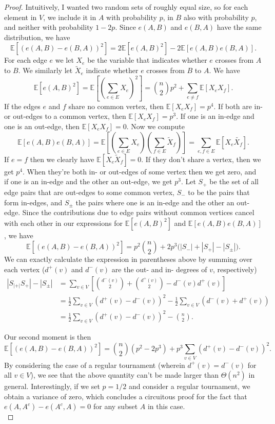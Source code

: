\documentclass[11pt,letterpaper]{report}
\newcommand{\E}{\mathbb{E}}
\begin{document}
\begin{proof}
    Intuitively, I wanted two random sets of roughly equal size, so for each element in $V$, we include it in $A$ with probability $p$, in $B$ also with probability $p$, and neither with probability $1-2p$.
    Since $e(A,B)$ and $e(B,A)$ have the same distribution, we have
    \[
        \E[(e(A,B) - e(B,A))^2] = 2\E[e(A,B)^2] - 2\E[e(A,B)e(B,A)].
    \]
    For each edge $e$ we let $X_e$ be the variable that indicates whether $e$ crosses from $A$ to $B$.
    We similarly  let $\tilde{X}_e$ indicate whether $e$ crosses from $B$ to $A$.
    We have
    \[
        \E[e(A,B)^2] = \E\left[\left(\sum_{e\in E}X_e\right)^2\right] = \binom{n}{2}p^2 + \sum_{e\neq f}\E[X_eX_f].
    \]
    If the edges $e$ and $f$ share no common vertex, then $\E[X_eX_f] = p^4$.
    If both are in- or out-edges to a common vertex, then $\E[X_eX_f] = p^3$.
    If one is an in-edge and one is an out-edge, then $\E[X_eX_f] = 0$.
    Now we compute
    \[
        \E[e(A,B)e(B,A)] = \E\left[\left(\sum_{e\in E}X_e\right)\left(\sum_{f\in E}\tilde{X}_f\right)\right] = \sum_{e,f\in E}\E[X_e\tilde{X_f}].
    \]
    If $e = f$ then we clearly have $\E[X_e\tilde{X}_f] = 0$.
    If they don't share a vertex, then we get $p^4$.
    When they're both in- or out-edges of some vertex then we get zero, and if one is an in-edge and the other an out-edge, we get $p^3$.
    Let $S_+$ be the set of all edge pairs that are out-edges to some common vertex, $S_-$ to be the pairs that form in-edges, and $S_{\pm}$ the pairs where one is an in-edge and the other an out-edge.
    Since the contributions due to edge pairs without common vertices cancel with each other in our expressions for $\E[e(A,B)^2]$ and $\E[e(A,B)e(B,A)]$, we have
    \[
        \E[(e(A,B) - e(B,A))^2] = p^2\binom{n}{2}+2p^3\bigg(|S_-| + |S_+| - |S_\pm| \bigg).
    \]
    We can exactly calculate the expression in parentheses above by summing over each vertex ($d^+(v)$ and $d^-(v)$ are the out- and in- degrees of $v$, respectively)
    \begin{align*}
        |S_|+|S_+|-|S_\pm|&= \sum_{v\in V}\left[\binom{d^-(v)}{2} + \binom{d^+(v)}{2} - d^-(v)d^+(v)\right]\\
        &= \frac{1}{2}\sum_{v\in V}(d^+(v)-d^-(v))^2 - \frac{1}{2}\sum_{v\in V}(d^-(v)+d^+(v))\\
        &= \frac{1}{2}\sum_{v\in V}(d^+(v)-d^-(v))^2 - \binom{n}{2}.
    \end{align*}

    Our second moment is then
    \[
        \E[(e(A,B) - e(B,A))^2] = \binom{n}{2}(p^2-2p^3) + p^3\sum_{v\in V}(d^+(v)-d^-(v))^2.
    \]
    By considering the case of a regular tournament (wherein $d^+(v) = d^-(v)$ for all $v\in V$), we see that the above quantity can't be made larger than $\Theta(n^2)$ in general.
    Interestingly, if we set $p = 1/2$ and consider a regular tournament, we obtain a variance of zero, which concludes a circuitous proof for the fact that $e(A,A^c)-e(A^c,A) = 0$ for any subset $A$ in this case.\\


\end{proof}
\end{document}
